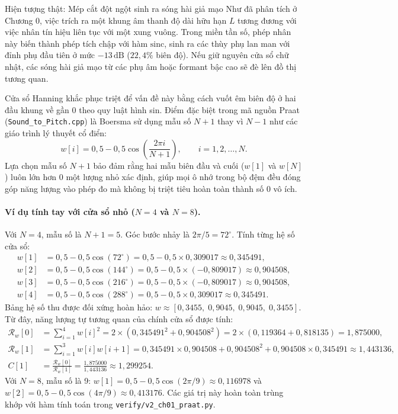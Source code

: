 \begin{firstprin}{Hiện tượng thật: Mép cắt đột ngột sinh ra sóng hài giả mạo}
Như đã phân tích ở Chương 0, việc trích ra một khung âm thanh độ dài hữu hạn $L$ tương đương với việc nhân tín hiệu liên tục với một xung vuông. Trong miền tần số, phép nhân này biến thành phép tích chập với hàm $\mathrm{sinc}$, sinh ra các thùy phụ lan man với đỉnh phụ đầu tiên ở mức $-13\,\text{dB}$ ($22{,}4\%$ biên độ). Nếu giữ nguyên cửa sổ chữ nhật, các sóng hài giả mạo từ các phụ âm hoặc formant bậc cao sẽ đè lên đồ thị tương quan.

Cửa sổ Hanning khắc phục triệt để vấn đề này bằng cách vuốt êm biên độ ở hai đầu khung về gần 0 theo quy luật hình sin. Điểm đặc biệt trong mã nguồn Praat (\texttt{Sound\_to\_Pitch.cpp}) là Boersma sử dụng mẫu số $N+1$ thay vì $N-1$ như các giáo trình lý thuyết cổ điển:
\[
w[i] = 0{,}5 - 0{,}5 \cos\left(\frac{2\pi i}{N+1}\right), \qquad i = 1, 2, \dots, N.
\]
Lựa chọn mẫu số $N+1$ bảo đảm rằng hai mẫu biên đầu và cuối ($w[1]$ và $w[N]$) luôn lớn hơn 0 một lượng nhỏ xác định, giúp mọi ô nhớ trong bộ đệm đều đóng góp năng lượng vào phép đo mà không bị triệt tiêu hoàn toàn thành số 0 vô ích.
\end{firstprin}

\paragraph{Ví dụ tính tay với cửa sổ nhỏ ($N = 4$ và $N = 8$).}
Với $N = 4$, mẫu số là $N + 1 = 5$. Góc bước nhảy là $2\pi / 5 = 72^\circ$.
Tính từng hệ số cửa sổ:
\begin{align*}
w[1] &= 0{,}5 - 0{,}5\cos(72^\circ) = 0{,}5 - 0{,}5 \times 0{,}309017 \approx 0{,}345491,\\[4pt]
w[2] &= 0{,}5 - 0{,}5\cos(144^\circ) = 0{,}5 - 0{,}5 \times (-0{,}809017) \approx 0{,}904508,\\[4pt]
w[3] &= 0{,}5 - 0{,}5\cos(216^\circ) = 0{,}5 - 0{,}5 \times (-0{,}809017) \approx 0{,}904508,\\[4pt]
w[4] &= 0{,}5 - 0{,}5\cos(288^\circ) = 0{,}5 - 0{,}5 \times 0{,}309017 \approx 0{,}345491.
\end{align*}
Bảng hệ số thu được đối xứng hoàn hảo: $w \approx [0{,}3455,\; 0{,}9045,\; 0{,}9045,\; 0{,}3455]$.
Từ đây, năng lượng tự tương quan của chính cửa sổ được tính:
\begin{align*}
\mathcal{R}_w[0] &= \sum_{i=1}^{4} w[i]^2 = 2 \times (0{,}345491^2 + 0{,}904508^2) = 2 \times (0{,}119364 + 0{,}818135) = 1{,}875000,\\[6pt]
\mathcal{R}_w[1] &= \sum_{i=1}^{3} w[i]w[i+1] = 0{,}345491 \times 0{,}904508 + 0{,}904508^2 + 0{,}904508 \times 0{,}345491 \approx 1{,}443136,\\[6pt]
C[1] &= \frac{\mathcal{R}_w[0]}{\mathcal{R}_w[1]} = \frac{1{,}875000}{1{,}443136} \approx 1{,}299254.
\end{align*}
Với $N = 8$, mẫu số là 9: $w[1] = 0{,}5 - 0{,}5\cos(2\pi/9) \approx 0{,}116978$ và $w[2] = 0{,}5 - 0{,}5\cos(4\pi/9) \approx 0{,}413176$. Các giá trị này hoàn toàn trùng khớp với hàm tính toán trong \texttt{verify/v2\_ch01\_praat.py}.

